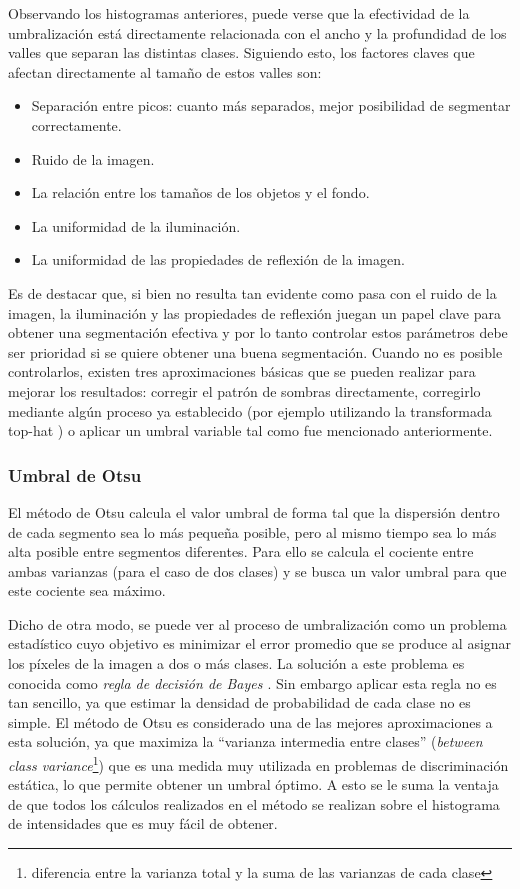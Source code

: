 Observando los histogramas anteriores, puede verse que la efectividad de la umbralización está directamente relacionada con el ancho y la profundidad de los valles que separan las distintas clases. Siguiendo esto, los factores claves que afectan directamente al tamaño de estos valles son:
\begin{itemize}
\item Separación entre picos: cuanto más separados, mejor posibilidad de segmentar correctamente.
\item Ruido de la imagen.
\item La relación entre los tamaños de los objetos y el fondo.
\item La uniformidad de la iluminación.
\item La uniformidad de las propiedades de reflexión de la imagen.
\end{itemize}

Es de destacar que, si bien no resulta tan evidente como pasa con el ruido de la imagen, la iluminación y las propiedades de reflexión juegan un papel clave para obtener una segmentación efectiva y por lo tanto controlar estos parámetros debe ser prioridad si se quiere obtener una buena segmentación. Cuando no es posible controlarlos, existen tres aproximaciones básicas que se pueden realizar para mejorar los resultados: corregir el patrón de sombras directamente, corregirlo mediante algún proceso ya establecido (por ejemplo utilizando la transformada top-hat \cite{tophat}) o aplicar un umbral variable tal como fue mencionado anteriormente.

\subsubsection{Umbral de Otsu}

El método de Otsu \cite{otsu} calcula el valor umbral de forma tal que la dispersión dentro de cada segmento sea lo más pequeña posible, pero al mismo tiempo sea lo más alta posible entre segmentos diferentes. Para ello se calcula el cociente entre ambas varianzas (para el caso de dos clases) y se busca un valor umbral para que este cociente sea máximo.

Dicho de otra modo, se puede ver al proceso de umbralización como un problema estadístico cuyo objetivo es minimizar el error promedio que se produce al asignar los píxeles de la imagen a dos o más clases. La solución a este problema es conocida como \textit{regla de decisión de Bayes \cite{bayes}}. Sin embargo aplicar esta regla no es tan sencillo, ya que estimar la densidad de probabilidad de cada clase no es simple. El método de Otsu es considerado una de las mejores aproximaciones a esta solución, ya que maximiza la ``varianza intermedia entre clases'' (\textit{between class variance}\footnote{diferencia entre la varianza total y la suma de las varianzas de cada clase\cite{betweenvarianze}}) que es una medida muy utilizada en problemas de discriminación estática, lo que permite obtener un umbral óptimo. A esto se le suma la ventaja de que todos los cálculos realizados en el método se realizan sobre el histograma de intensidades que es muy fácil de obtener.


